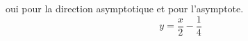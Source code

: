 oui pour la direction asymptotique et pour l'asymptote.
\begin{displaymath}
 y = \frac{x}{2} -\frac{1}{4}
\end{displaymath}
